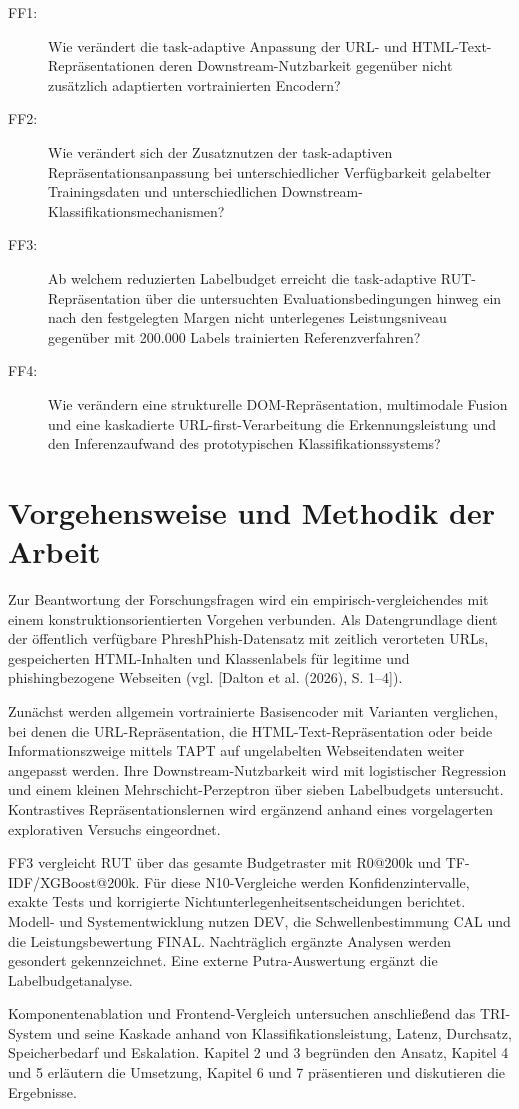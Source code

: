 \begin{description}
\item[FF1:] Wie verändert die task-adaptive Anpassung der URL- und HTML-Text-Repräsentationen
deren Downstream-Nutzbarkeit gegenüber nicht zusätzlich adaptierten vortrainierten Encodern?

\item[FF2:] Wie verändert sich der Zusatznutzen der task-adaptiven Repräsentationsanpassung bei
unterschiedlicher Verfügbarkeit gelabelter Trainingsdaten und unterschiedlichen
Downstream-Klassifikationsmechanismen?

\item[FF3:] Ab welchem reduzierten Labelbudget erreicht die task-adaptive RUT-Repräsentation
über die untersuchten Evaluationsbedingungen hinweg ein nach den festgelegten Margen
nicht unterlegenes Leistungsniveau gegenüber mit 200.000 Labels trainierten Referenzverfahren?

\item[FF4:] Wie verändern eine strukturelle DOM-Repräsentation, multimodale Fusion und eine
kaskadierte URL-first-Verarbeitung die Erkennungsleistung und den Inferenzaufwand des
prototypischen Klassifikationssystems?
\end{description}


\section{Vorgehensweise und Methodik der Arbeit}

Zur Beantwortung der Forschungsfragen wird ein empirisch-vergleichendes mit einem
konstruktionsorientierten Vorgehen verbunden. Als Datengrundlage dient der öffentlich verfügbare
PhreshPhish-Datensatz mit zeitlich verorteten URLs, gespeicherten HTML-Inhalten und
Klassenlabels für legitime und phishingbezogene Webseiten (vgl. [Dalton et al. (2026), S. 1--4]).

Zunächst werden allgemein vortrainierte Basisencoder mit Varianten verglichen, bei denen die
URL-Repräsentation, die HTML-Text-Repräsentation oder beide Informationszweige mittels TAPT
auf ungelabelten Webseitendaten weiter angepasst werden. Ihre Downstream-Nutzbarkeit wird mit
logistischer Regression und einem kleinen Mehrschicht-Perzeptron über sieben Labelbudgets
untersucht. Kontrastives Repräsentationslernen wird ergänzend anhand eines vorgelagerten
explorativen Versuchs eingeordnet.

FF3 vergleicht RUT über das gesamte Budgetraster mit R0@200k und TF-IDF/XGBoost@200k.
Für diese N10-Vergleiche werden Konfidenzintervalle, exakte Tests und korrigierte
Nichtunterlegenheitsentscheidungen berichtet. Modell- und Systementwicklung nutzen DEV,
die Schwellenbestimmung CAL und die Leistungsbewertung FINAL. Nachträglich ergänzte
Analysen werden gesondert gekennzeichnet. Eine externe Putra-Auswertung ergänzt die
Labelbudgetanalyse.

Komponentenablation und Frontend-Vergleich untersuchen anschließend das TRI-System und
seine Kaskade anhand von Klassifikationsleistung, Latenz, Durchsatz, Speicherbedarf und
Eskalation. Kapitel 2 und 3 begründen den Ansatz, Kapitel 4 und 5 erläutern die Umsetzung,
Kapitel 6 und 7 präsentieren und diskutieren die Ergebnisse.
